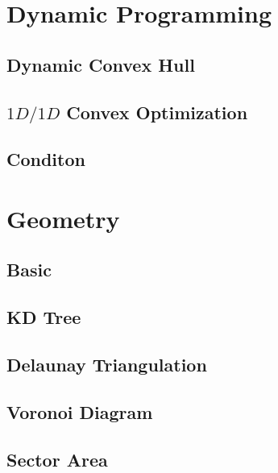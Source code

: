 \documentclass[a4paper,10pt,twocolumn,oneside]{article}
\begin{document}
\section{Dynamic Programming}
% 
\subsection{Dynamic Convex Hull}

\subsection{$1D/1D$ Convex Optimization}

\subsection{Conditon}

\section{Geometry}
\subsection{Basic}

\subsection{KD Tree}

\subsection{Delaunay Triangulation}

\subsection{Voronoi Diagram}

\subsection{Sector Area}

% 
\end{document}
